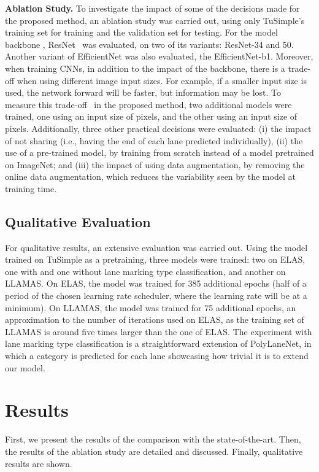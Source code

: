 \documentclass[a4paper,conference]{IEEEtran}
\begin{document}
\textbf{Ablation Study.}
To investigate the impact of some of the decisions made for the proposed method, an ablation study was carried out, using only TuSimple's training set for training and the validation set for testing. For the model backbone , ResNet~\cite{he2016deep} was evaluated, on two of its variants: ResNet-34 and 50. Another variant of EfficientNet was also evaluated, the EfficientNet-b1. Moreover, when training CNNs, in addition to the impact of the backbone, there is a trade-off when using different image input sizes. For example, if a smaller input size is used, the network forward will be faster, but information may be lost. To measure this trade-off~\cite{satzoda2014icpr} in the proposed method, two additional models were trained, one using an input size of  pixels, and the other using an input size of  pixels. Additionally, three other practical decisions were evaluated: (i) the impact of not sharing  (i.e., having the end of each lane predicted individually), (ii) the use of a pre-trained model, by training from scratch instead of a model pretrained on ImageNet; and (iii) the impact of using data augmentation, by removing the online data augmentation, which reduces the variability seen by the model at training time.

\subsection{Qualitative Evaluation}
For qualitative results, an extensive evaluation was carried out. Using the model trained on TuSimple as a pretraining, three models were trained: two on ELAS, one with and one without lane marking type classification, and another on LLAMAS. On ELAS, the model was trained for 385 additional epochs (half of a period of the chosen learning rate scheduler, where the learning rate will be at a minimum). On LLAMAS, the model was trained for 75 additional epochs, an approximation to the number of iterations used on ELAS, as the training set of LLAMAS is around five times larger than the one of ELAS. The experiment with lane marking type classification is a straightforward extension of PolyLaneNet, in which a category is predicted for each lane showcasing how trivial it is to extend our model.
 \section{Results}

First, we present the results of the comparison with the state-of-the-art. Then, the results of the ablation study are detailed and discussed. Finally, qualitative results are shown.
\end{document}
